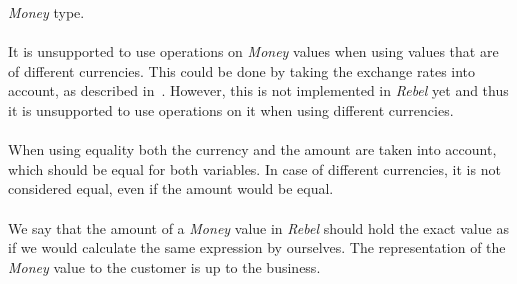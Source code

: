 \textit{Money} type.\\
\\
It is unsupported to use operations on \textit{Money} values when using values
that are of different currencies. This could be done by taking the exchange
rates into account, as described in~\cite{fowler2002patterns}. However, this is
not implemented in \textit{Rebel} yet and thus it is unsupported to use
operations on it when using different currencies.\\
\\
When using equality both the currency and the amount are taken into account,
which should be equal for both variables. In case of different currencies, it is
not considered equal, even if the amount would be equal.\\
\\
We say that the amount of a \textit{Money} value in \textit{Rebel} should hold
the exact value as if we would calculate the same expression by ourselves. The
representation of the \textit{Money} value to the customer is up to the
business.


